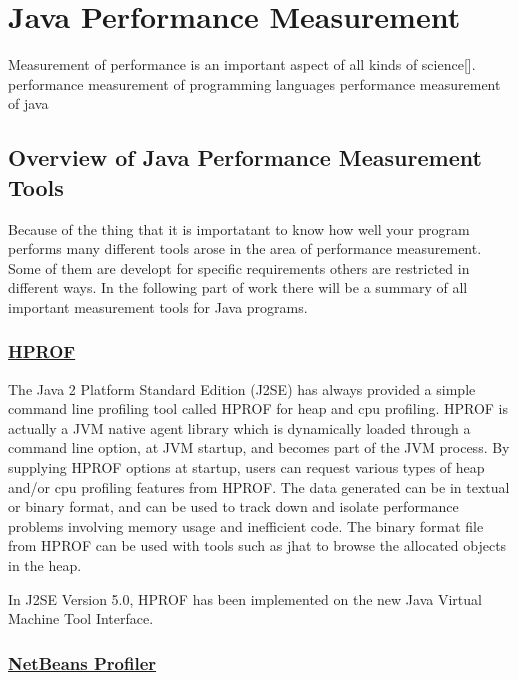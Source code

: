\chapter{Java Performance Measurement}
\label{chap:introduction}

Measurement of performance is an important aspect of all kinds of science[]. 
performance measurement of programming languages
performance measurement of java 


\section{Overview of Java Performance Measurement Tools}


Because of the thing that it is importatant to know how well your program performs many different tools arose 
in the area of performance measurement. Some of them are developt for specific requirements others are restricted in different ways. In the following part of work there will be a summary of all important measurement tools for Java programs.

\subsection{\href{https://profiler.netbeans.org/}{HPROF}}

The Java 2 Platform Standard Edition (J2SE) has always provided a simple command line profiling tool called HPROF for heap and cpu profiling. HPROF is actually a JVM native agent library which is dynamically loaded through a command line option, at JVM startup, and becomes part of the JVM process. By supplying HPROF options at startup, users can request various types of heap and/or cpu profiling features from HPROF. The data generated can be in textual or binary format, and can be used to track down and isolate performance problems involving memory usage and inefficient code. The binary format file from HPROF can be used with tools such as jhat to browse the allocated objects in the heap.

In J2SE Version 5.0, HPROF has been implemented on the new Java Virtual Machine Tool Interface. 


\subsection{\href{https://profiler.netbeans.org/}{NetBeans Profiler}}

